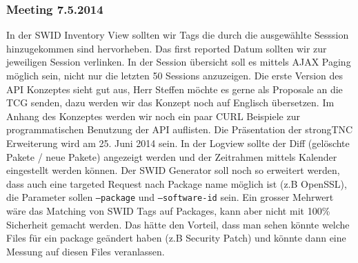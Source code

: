 \subsubsection{Meeting 7.5.2014}
In der SWID Inventory View sollten wir Tags die durch die ausgewählte Sesssion hinzugekommen sind hervorheben. Das first reported Datum sollten wir zur jeweiligen Session verlinken. In der Session übersicht soll es mittels AJAX Paging möglich sein, nicht nur die letzten 50 Sessions anzuzeigen. Die erste Version des API Konzeptes sieht gut aus, Herr Steffen möchte es gerne als Proposale an die TCG senden, dazu werden wir das Konzept noch auf Englisch übersetzen. Im Anhang des Konzeptes werden wir noch ein paar CURL Beispiele zur programmatischen Benutzung der API auflisten. Die Präsentation der strongTNC Erweiterung wird am 25. Juni 2014 sein. In der Logview sollte der Diff (gelöschte Pakete / neue Pakete) angezeigt werden und der Zeitrahmen mittels Kalender eingestellt werden können. Der SWID Generator soll noch so erweitert werden, dass auch eine targeted Request nach Package name möglich ist (z.B OpenSSL), die Parameter sollen \texttt{---package} und \texttt{---software-id} sein. Ein grosser Mehrwert wäre das Matching von SWID Tags auf Packages, kann aber nicht mit 100\% Sicherheit gemacht werden. Das hätte den Vorteil, dass man sehen könnte welche Files für ein package geändert haben (z.B Security Patch) und könnte dann eine Messung auf diesen Files veranlassen.



